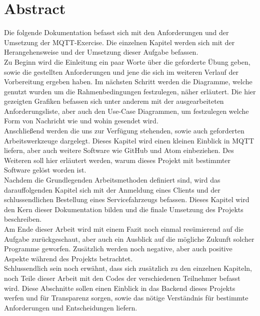 
\section{Abstract}\label{abstract}
Die folgende Dokumentation befasst sich mit den Anforderungen und der Umsetzung der MQTT-Exercise. Die einzelnen Kapitel werden sich mit der Herangehensweise und der Umsetzung dieser Aufgabe befassen.\\
Zu Beginn wird die Einleitung ein paar Worte über die geforderte Übung geben, sowie die gestellten Anforderungen und jene die sich im weiteren Verlauf der Vorbereitung ergeben haben.
Im nächsten Schritt werden die Diagramme, welche genutzt wurden um die Rahmenbedingungen festzulegen, näher erläutert. Die hier gezeigten Grafiken befassen sich unter anderem mit der ausgearbeiteten Anforderungsliste, aber auch den Use-Case Diagrammen, um festzulegen welche Form von Nachricht wie und wohin gesendet wird.\\
Anschließend werden die uns zur Verfügung stehenden, sowie auch geforderten Arbeitswerkzeuge dargelegt. Dieses Kapitel wird einen kleinen Einblick in MQTT liefern, aber auch weitere Software wie GitHub und Atom einbeziehen. Des Weiteren soll hier erläutert werden, warum dieses Projekt mit bestimmter Software gelöst worden ist.\\
Nachdem die Grundlegenden Arbeitsmethoden definiert sind, wird das darauffolgenden Kapitel sich mit der Anmeldung eines Clients und der schlussendlichen Bestellung eines Servicefahrzeugs befassen. Dieses Kapitel wird den Kern dieser Dokumentation bilden und die finale Umsetzung des Projekts beschreiben.\\
Am Ende dieser Arbeit wird mit einem Fazit noch einmal resümierend auf die Aufgabe zurückgeschaut, aber auch ein Ausblick auf die mögliche Zukunft solcher Programme geworfen. Zusätzlich werden noch negative, aber auch positive Aspekte während des Projekts betrachtet.\\
Schlussendlich sein noch erwähnt, dass sich zusätzlich zu den einzelnen Kapiteln, noch Teile dieser Arbeit mit den Codes der verschiedenen Teilnehmer befasst wird. Diese Abschnitte sollen einen Einblick in das Backend dieses Projekts werfen und für Transparenz sorgen, sowie das nötige Verständnis für bestimmte Anforderungen und Entscheidungen liefern.